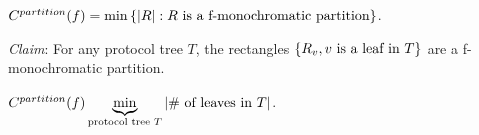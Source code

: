 \begin{definition}
    $C^{partition}(f) = \min \left \{ \left | R \right |: R \text{ is a f-monochromatic partition} \right \}$.
\end{definition}

\emph{Claim}: For any protocol tree $T$, the rectangles $\left \{ R_v, v \text{ is a leaf in } T \right \}$ are a f-monochromatic partition.

\begin{corollary}
    $C^{partition}(f) \underbrace{\min}_{\text{protocol tree } T} \left | \# \text{ of leaves in } T \right |$.
\end{corollary}


